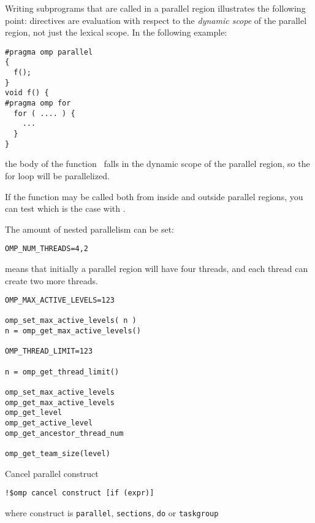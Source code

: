 Writing subprograms that are called in a parallel region illustrates
the following point: directives are evaluation with respect to the
\emph{dynamic scope} of the
parallel region, not just the lexical scope. In the following example:
\begin{lstlisting}
#pragma omp parallel
{
  f();
}
void f() {
#pragma omp for
  for ( .... ) {
    ...
  }
}
\end{lstlisting}
the body of the function~ falls in the dynamic scope of the
parallel region, so the for loop will be parallelized.

If the function may be called both from inside and outside parallel
regions, you can test which is the case with .

The amount of nested parallelism can be set:
\begin{verbatim}
OMP_NUM_THREADS=4,2
\end{verbatim}
means that initially a parallel region will have four threads, and
each thread can create two more threads.

\begin{verbatim}
OMP_MAX_ACTIVE_LEVELS=123

omp_set_max_active_levels( n )
n = omp_get_max_active_levels()

OMP_THREAD_LIMIT=123

n = omp_get_thread_limit()

omp_set_max_active_levels
omp_get_max_active_levels
omp_get_level
omp_get_active_level
omp_get_ancestor_thread_num

omp_get_team_size(level)
\end{verbatim}


 {Cancel parallel construct}

\begin{lstlisting}
!$omp cancel construct [if (expr)]
\end{lstlisting}
where construct is
\lstinline{parallel},
\lstinline{sections},
\lstinline{do}
or
\lstinline{taskgroup}

